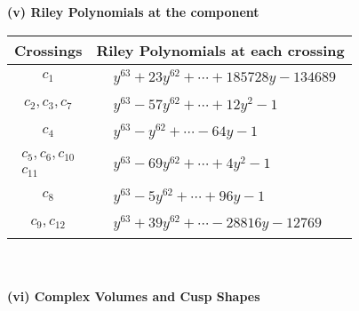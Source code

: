 \documentclass[1p]{elsarticle_modified}
\theoremstyle{definition}
\begin{document}
\newpage\renewcommand{\arraystretch}{1}
\flushleft \textbf{(v) Riley Polynomials at the component}\newline \\
\begin{tabular}{m{50pt}|m{274pt}}
Crossings & \hspace{64pt}Riley Polynomials at each crossing \\
\hline $$\begin{aligned}c_{1}\end{aligned}$$&$\begin{aligned}
&y^{63}+23 y^{62}+\cdots+185728 y-134689
\end{aligned}$\\
\hline $$\begin{aligned}c_{2},c_{3},c_{7}\end{aligned}$$&$\begin{aligned}
&y^{63}-57 y^{62}+\cdots+12 y^2-1
\end{aligned}$\\
\hline $$\begin{aligned}c_{4}\end{aligned}$$&$\begin{aligned}
&y^{63}- y^{62}+\cdots-64 y-1
\end{aligned}$\\
\hline $$\begin{aligned}c_{5},c_{6},c_{10}\\c_{11}\end{aligned}$$&$\begin{aligned}
&y^{63}-69 y^{62}+\cdots+4 y^2-1
\end{aligned}$\\
\hline $$\begin{aligned}c_{8}\end{aligned}$$&$\begin{aligned}
&y^{63}-5 y^{62}+\cdots+96 y-1
\end{aligned}$\\
\hline $$\begin{aligned}c_{9},c_{12}\end{aligned}$$&$\begin{aligned}
&y^{63}+39 y^{62}+\cdots-28816 y-12769
\end{aligned}$\\
\hline
\end{tabular}\\~\\
\newpage\flushleft \textbf{(vi) Complex Volumes and Cusp Shapes}
\end{document}
